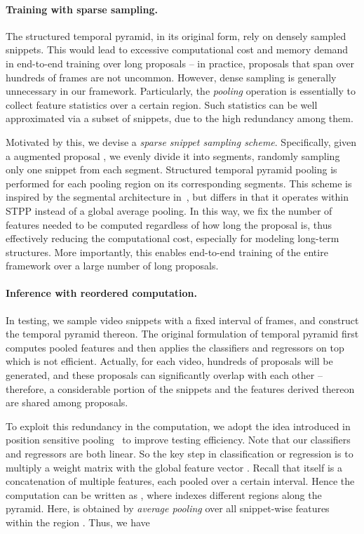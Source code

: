 \documentclass[10pt,twocolumn,letterpaper]{article}
\begin{document}
\paragraph{Training with sparse sampling.}
The structured temporal pyramid, in its original form, rely on
densely sampled snippets. This would lead to excessive computational cost
and memory demand in end-to-end training over long proposals -- in practice,
proposals that span over hundreds of frames are not uncommon.
However, dense sampling is generally unnecessary in our framework.
Particularly, the \emph{pooling} operation is essentially to collect
feature statistics over a certain region. Such statistics can be well
approximated via a subset of snippets, due to the high redundancy
among them.

Motivated by this, we devise a \emph{sparse snippet sampling scheme}.
Specifically, given a augmented proposal ,
we evenly divide it into  segments,
randomly sampling only one snippet from each segment.
Structured temporal pyramid pooling is performed for each pooling region on its corresponding segments.
This scheme is inspired by the segmental architecture in~\cite{Wang2016TSN},
but differs in that it operates within STPP instead of a global average pooling.
In this way, we fix the number of features needed to be computed regardless
of how long the proposal is, thus effectively reducing the computational cost,
especially for modeling long-term structures.
More importantly, this enables end-to-end training of the entire framework
over a large number of long proposals.

\vspace{-12pt}
\paragraph{Inference with reordered computation.}
In testing, we sample video snippets with a fixed interval of  frames,
and construct the temporal pyramid thereon.
The original formulation of temporal pyramid first computes pooled features
and then applies the classifiers and regressors on top which is not efficient.
Actually, for each video, hundreds of proposals will be generated,
and these proposals can significantly overlap with each
other -- therefore, a considerable portion of the snippets and
the features derived thereon are shared among proposals.

To exploit this redundancy in the computation,
we adopt the idea introduced in position sensitive pooling~\cite{Li2016RFCN}
to improve testing efficiency.
Note that our classifiers and regressors are both linear.
So the key step in classification or regression is to multiply
a weight matrix  with the global feature vector .
Recall that  itself is a concatenation of multiple features,
each pooled over a certain interval. Hence the computation
can be written as ,
where  indexes different regions along the pyramid.
Here,  is obtained by \emph{average pooling} over all snippet-wise features
within the region . Thus, we have
\end{document}

